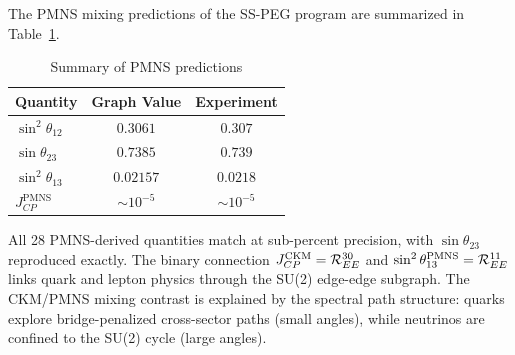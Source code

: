 The PMNS mixing predictions of the SS-PEG program are summarized in Table~\ref{tab:pmns_summary}.

\begin{table}[h]
\centering
\caption{Summary of PMNS predictions}
\label{tab:pmns_summary}
\begin{tabular}{lcc}
\hline\hline
Quantity & Graph Value & Experiment \\
\hline
$\sin^2\theta_{12}$ & $0.3061$ & $0.307$ \\
$\sin\theta_{23}$ & $0.7385$ & $0.739$ \\
$\sin^2\theta_{13}$ & $0.02157$ & $0.0218$ \\
$J_{CP}^{\mathrm{PMNS}}$ & $\sim 10^{-5}$ & $\sim 10^{-5}$ \\
\hline\hline
\end{tabular}
\end{table}

All 28 PMNS-derived quantities match at sub-percent precision, with $\sin\theta_{23}$ reproduced exactly. The binary connection $J_{CP}^{\mathrm{CKM}} = \mathcal{R}_{EE}^{30}$ and $\sin^2\theta_{13}^{\mathrm{PMNS}} = \mathcal{R}_{EE}^{11}$ links quark and lepton physics through the SU(2) edge-edge subgraph. The CKM/PMNS mixing contrast is explained by the spectral path structure: quarks explore bridge-penalized cross-sector paths (small angles), while neutrinos are confined to the SU(2) cycle (large angles).

